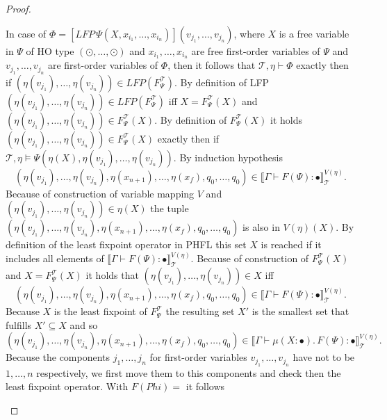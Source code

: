 \begin{proof}
\begin{compactitem}
        \item In case of $\Phi = [LFP\,\Psi(X, x_{i_1}, \dots, x_{i_n})](v_{j_1}, \dots, v_{j_n})$, where $X$ is a
        free variable in $\Psi$ of HO type $(\odot, \dots, \odot)$ and $x_{i_1}, \dots, x_{i_n}$ are free first-order
        variables of $\Psi$ and $v_{j_1}, \dots, v_{j_n}$ are first-order variables of $\Phi$, then it follows that
        $\mathcal{T}, \eta \vdash \Phi$ exactly then if $(\eta(v_{j_1}), \dots, \eta(v_{j_n})) \in LFP
        (F_\Psi^\mathcal{T})$. By definition of LFP $(\eta(v_{j_1}), \dots, \eta(v_{j_n})) \in
        LFP(F_\Psi^\mathcal{T})$ iff $X = F_\Psi^\mathcal{T}(X)$ and $(\eta(v_{j_1}), \dots, \eta(v_{j_n})) \in
        F_\Psi^\mathcal{T}(X)$. By definition of $F_\Psi^\mathcal{T}(X)$ it holds $(\eta
        (v_{j_1}), \dots, \eta(v_{j_n})) \in F_\Psi^\mathcal{T}(X)$ exactly then if $\mathcal{T}, \eta \models \Psi
        (\eta(X), \eta(v_{j_1}), \dots, \eta(v_{j_n}))$. By induction hypothesis
        \[(\eta(v_{j_1}), \dots, \eta(v_{j_n}), \eta(x_{n+1}), \dots, \eta(x_f), q_0, \dots, q_0) \in \llbracket
        \Gamma \vdash F(\Psi) \colon \bullet \rrbracket^{V(\eta)}_\mathcal{T}.\]
        Because of construction of variable mapping $V$ and $(\eta(v_{j_1}), \dots, \eta(v_{j_n})) \in \eta(X)$ the
        tuple $(\eta(v_{j_1}), \dots, \eta(v_{j_n}), \eta(x_{n+1}), \dots, \eta(x_f), q_0, \dots, q_0)$ is also in $V
        (\eta)(X)$. By definition of the least fixpoint operator in PHFL this set $X$ is reached if it includes all
        elements of $\llbracket \Gamma \vdash F(\Psi) \colon \bullet \rrbracket^{V(\eta)}_\mathcal{T}$. Because of
        construction of $F_\Psi^\mathcal{T}(X)$ and $X = F_\Psi^\mathcal{T}(X)$ it holds that $(\eta(v_{j_1}),
        \dots, \eta(v_{j_n})) \in X$ iff
        \[(\eta(v_{j_1}), \dots, \eta(v_{j_n}), \eta(x_{n+1}), \dots, \eta(x_f), q_0, \dots, q_0) \in \llbracket
        \Gamma \vdash F(\Psi) \colon \bullet \rrbracket^{V(\eta)}_\mathcal{T}.\]
        Because $X$ is the least fixpoint of $F_\Psi^\mathcal{T}$ the resulting set $X'$ is the smallest set that
        fulfills $X' \subseteq X$ and so
        \[(\eta(v_{j_1}), \dots, \eta(v_{j_n}), \eta(x_{n+1}), \dots, \eta(x_f), q_0, \dots, q_0) \in \llbracket
        \Gamma \vdash \mu(X\colon \bullet).\,F(\Psi) \colon \bullet \rrbracket^{V(\eta)}_\mathcal{T}.\]
        Because the components $j_1, \dots, j_n$ for first-order variables $v_{j_1}, \dots, v_{j_n}$ have not to be $1,
        \dots, n$ respectively, we first move them to this components and check then the least fixpoint operator.
        With $F(Phi) = $ it follows

\end{compactitem}
\end{proof}
